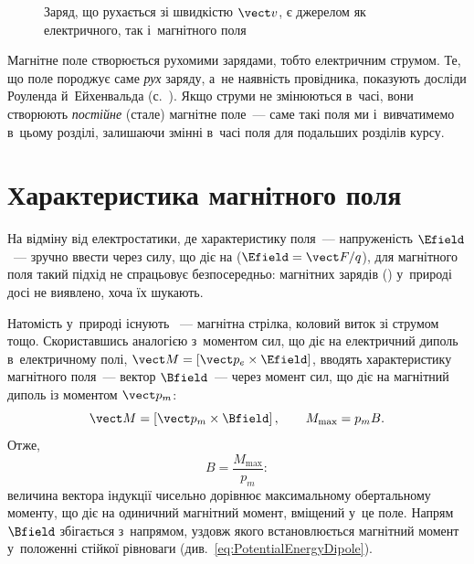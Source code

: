 \begin{figure}\centering
	\caption{Заряд, що рухається зі швидкістю $\vect v$, є джерелом як електричного, так
		і~магнітного поля\label{pic:ChargeFields}}
\end{figure}

Магнітне поле створюється рухомими зарядами, тобто електричним струмом. Те, що поле
породжує саме \emph{рух} заряду, а~не наявність провідника, показують досліди Роуленда
й~Ейхенвальда (с.~\pageref{hist:RowlandEichenwald}). Якщо струми не змінюються в~часі,
вони створюють \emph{постійне} (стале) магнітне поле~--- саме такі поля ми і~вивчатимемо
в~цьому розділі, залишаючи змінні в~часі поля для подальших розділів курсу.


\section{Характеристика магнітного поля}\hypertarget{magnetic-field-characteristics}{}


На відміну від електростатики, де характеристику поля~--- напруженість $\Efield$~---
зручно ввести через силу, що діє на  ($\Efield = \vect F/q$), для
магнітного поля такий підхід не спрацьовує безпосередньо: магнітних зарядів
() у~природі досі не виявлено, хоча їх шукають.

Натомість у~природі існують ~--- магнітна стрілка, коловий виток зі
струмом тощо. Скориставшись аналогією з~моментом сил, що діє на електричний диполь
в~електричному полі, $\vect M = \left[\vect p_e\times\Efield\right]$, вводять
характеристику магнітного поля~--- вектор $\Bfield$~--- через момент сил, що діє на
магнітний диполь із моментом $\vect p_m$:
\begin{equation}\label{eq:TorqueDipoleAnalogy}
	\vect M = \left[\vect p_m\times\Bfield\right], \qquad M_{\max} = p_m B.
\end{equation}
Отже,
\begin{equation*}
	B = \frac{M_{\max}}{p_m}:
\end{equation*}
величина вектора індукції чисельно дорівнює максимальному обертальному моменту, що діє на
одиничний магнітний момент, вміщений у~це поле. Напрям $\Bfield$ збігається з~напрямом,
уздовж якого встановлюється магнітний момент у~положенні стійкої рівноваги
(див.~\eqref{eq:PotentialEnergyDipole}).

